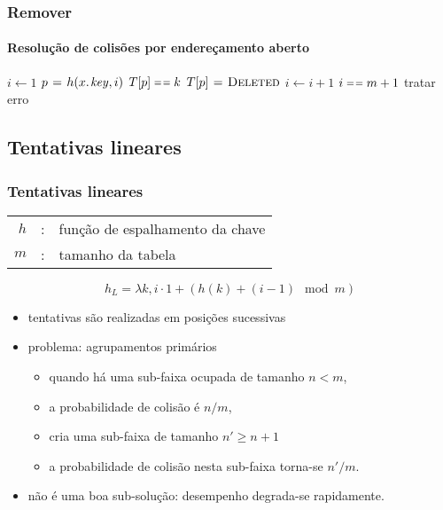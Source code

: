 \documentclass{beamer}
\begin{document}
\begin{frame}

\frametitle{Remover}
\framesubtitle{Resolução de colisões por endereçamento aberto}

\begin{codebox}
    \li $i \gets 1$
    \li \Repeat 
    \li   $p \gets h(\attrib{x}{key}, i)$ 
    \li   \If $T[p] \isequal k$
    \li   \Then $T[p] \mathrel{\hspace{1pt}=\hspace{1pt}} \textnormal{\scshape Deleted}$
          \End
    \li   $i \gets i+1$
          \End
    \li \Until $i \isequal m+1$
    \li \Comment tratar erro 
\end{codebox}

\end{frame}

\subsection{Tentativas lineares}

\begin{frame}

\frametitle{Tentativas lineares}

\begin{tabular}{rcl}
$h$ & : & função de espalhamento da chave \\
$m$ & : & tamanho da tabela
\end{tabular}

$$h_L = \lambda k, i \cdot 1 + (h(k) + (i - 1) \mod m)$$

\begin{itemize}

\item tentativas são realizadas em posições sucessivas

\item problema: \alert{agrupamentos primários}

\begin{itemize}

  \item quando há uma sub-faixa ocupada de tamanho $n < m$, 

  \item a probabilidade de colisão é $n/m$, 

  \item cria uma sub-faixa de tamanho $n' \ge n+1$

  \item a probabilidade de colisão nesta sub-faixa torna-se $n'/m$.

\end{itemize}

\item não é uma boa sub-solução: desempenho degrada-se rapidamente.

\end{itemize}

\end{frame}
\end{document}
